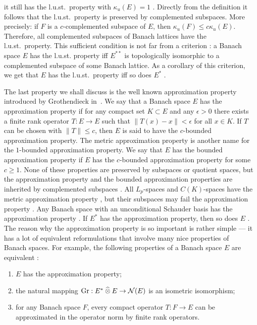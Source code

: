 it still has the l.u.st.\ property with $\kappa_u(E)=1$
\cite[theorem 17.1]{DiestAbsSumOps}. Directly from the definition it follows
that the l.u.st.\ property is preserved by complemented subspaces. More
precisely: if $F$ is a $c$-complemented subspace of $E$, 
then $\kappa_u(F)\leq c\kappa_u(E)$. 
Therefore, all complemented subspaces of Banach lattices have the
l.u.st.\ property. This sufficient condition is not far from a criterion
\cite[theorem 17.5]{DiestAbsSumOps}: a Banach space $E$ has the l.u.st.
property iff $E^{**}$ is topologically isomorphic to a complemented subspace of
some Banach lattice. As a corollary of this criterion, we get that $E$ has the
l.u.st.\ property iff so does $E^*$ \cite[corollary 17.6]{DiestAbsSumOps}.

The last property we shall discuss is the well known approximation property
introduced by Grothendieck in~\cite{GrothProdTenTopNucl}. We say that a Banach
space $E$ has the approximation property if for any compact set $K\subset E$ and
any $\epsilon>0$ there exists a finite rank operator $T:E\to E$ such 
that $\lVert T(x)-x\rVert<\epsilon$ for all $x\in K$. If $T$ can be 
chosen with $\lVert T\rVert\leq c$, then $E$ is said to have the $c$-bounded
approximation property. The metric approximation property is another name for
the $1$-bounded approximation property. We say that $E$ has the bounded
approximation property if $E$ has the $c$-bounded approximation property for
some $c\geq 1$. None of these properties are preserved by subspaces or quotient
spaces, but the approximation property and the bounded approximation properties
are inherited by complemented subspaces \cite[exercise 5.5]{DefFloTensNorOpId}. All $L_p$-spaces and $C(K)$-spaces have the metric approximation property
\cite[section 5.2(3)]{DefFloTensNorOpId}, but their subspaces may fail the
approximation property \cite[section 5.2(1)]{DefFloTensNorOpId}. Any Banach
space with an unconditional Schauder basis has the approximation property
\cite[example 4.4]{RyanIntroTensNormsBanSp}. If $E^*$ has the approximation
property, then so does $E$ \cite[corollary 5.7.2]{DefFloTensNorOpId}. The
reason why the approximation property is so important is rather simple --- it has a
lot of equivalent reformulations that involve many nice properties of Banach
spaces. For example, the following properties of a Banach space $E$ are equivalent
\cite[sections 5.3, 5.6]{DefFloTensNorOpId}:
\begin{enumerate}[label = (\roman*)]
  \item $E$ has the approximation property;

  \item the natural mapping $\operatorname{Gr}:E^*\mathbin{\widehat{\otimes}} E\to\mathcal{N}(E)$ is an isometric
  isomorphism;

  \item for any Banach space $F$, every compact operator $T:F\to E$ can be
  approximated in the operator norm by finite rank operators.
\end{enumerate}

